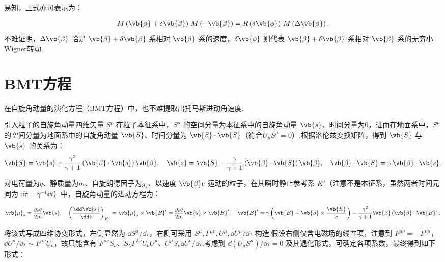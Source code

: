 易知，上式亦可表示为：

\begin{align*}
	M\left( \vb{\beta} + \delta\vb{\beta} \right) \, M\left( -\vb{\beta} \right)
	= R\left( \delta\vb{\phi} \right) \, M\left( \Delta\vb{\beta} \right).
\end{align*}
不难证明，\(\Delta\vb{\beta}\) 恰是 \(\vb{\beta} + \delta\vb{\beta}\) 系相对 \(\vb{\beta}\) 系的速度，\(\delta\vb{\phi}\) 则代表 \(\vb{\beta} + \delta\vb{\beta}\) 系相对 \(\vb{\beta}\) 系的无穷小Wigner转动.

\section{BMT方程}
在自旋角动量的演化方程（BMT方程）中，也不难提取出托马斯进动角速度.

引入粒子的自旋角动量四维矢量 \(S^\mu\).在粒子本征系中，\(S^\mu\) 的空间分量为本征系中的自旋角动量 \(\vb{s}\)、时间分量为0，进而在地面系中，\(S^\mu\) 的空间分量为地面系中的自旋角动量 \(\vb{S}\)、时间分量为 \(\vb{\beta} \cdot \vb{S}\)（符合\(U_\mu S^\mu = 0\)）.根据洛伦兹变换矩阵，得到 \(\vb{S}\) 与 \(\vb{s}\) 的关系为：
\begin{align*}
	\vb{S} = \vb{s} + \dfrac{\gamma^2}{\gamma + 1} \left( \vb{\beta} \cdot \vb{s} \right) \vb{\beta}, \quad
	\vb{s} = \vb{S} - \dfrac{\gamma}{\gamma + 1} \left( \vb{\beta} \cdot \vb{S} \right) \vb{\beta}, \quad
	\vb{\beta} \cdot \vb{S} = \gamma \, \vb{\beta} \cdot \vb{s}.
\end{align*}

对电荷量为\(q\)、静质量为\(m\)、自旋朗德因子为\(g_s\)、以速度 \(\vb{\beta} c\) 运动的粒子，在其瞬时静止参考系 \(K'\)（注意不是本征系，虽然两者时间元同为 \(\dd \tau = \gamma^{-1} \dd t\)）中，自旋角动量的进动方程为：

\begin{align*}
	\vb{\mu}_s = \dfrac{g_s q}{2m} \vb{s}, \quad
	\left( \dfrac{\dd \vb{s}}{\dd \tau} \right)_{K'} = \vb{\mu}_s \times \vb{B}' = \dfrac{g_s q}{2m} \vb{s} \times \vb{B}',\quad
	\vb{B}' = \gamma \left( \vb{B} - \vb{\beta} \times \dfrac{\vb{E}}{c} \right) - \dfrac{\gamma^2}{\gamma + 1} \vb{\beta} \left( \vb{\beta} \cdot \vb{B} \right).
\end{align*}

将该式写成四维协变形式，左侧显然为 \(\dd S^\mu/\dd \tau\)，右侧可采用 \(S^\mu, F^{\mu\nu}, U^\mu,\dd U^\mu/\dd \tau\) 构造.假设右侧仅含电磁场的线性项，注意到 \(F^{\mu\nu} = -F^{\nu\mu}\)，\(\dd U^\mu/\dd \tau \sim F^{\mu\nu} U_\nu\)，故只能含有 \(F^{\mu\nu} S_\nu\)、\(S_\lambda F^{\lambda\nu} U_\nu U^\mu\)、\(U^\mu S_\nu \dd U^\nu/\dd \tau\).考虑到 \(\dd(U_\mu S^\mu)/\dd \tau = 0\) 及其退化形式，可确定各项系数，最终得到如下形式：

